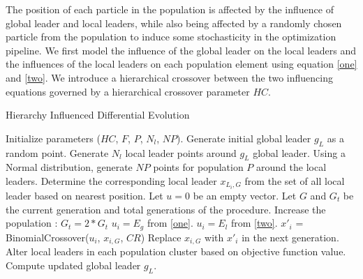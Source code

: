 \documentclass[a4paper,twoside]{article}
\begin{document}
The position of each particle in the population is affected by the influence of global leader and local leaders, while also being affected by a randomly chosen particle from the population to induce some stochasticity in the optimization pipeline. We first model the influence of the global leader on the local leaders and the influences of the local leaders  on each population element using equation \eqref{one} and \eqref{two}. We introduce a hierarchical crossover between the two influencing equations governed by a hierarchical crossover parameter $HC$.



\begin{algorithm}[b]
\caption{Hierarchy Influenced Differential Evolution}
\label{algo}
\begin{algorithmic}[1]
    \State Initialize parameters ($HC$, $F$, $P$, $N_l$, $NP$).
    \State Generate initial global leader $g_L$ as a random point.
    \State Generate $N_l$ local leader points around $g_L$ global leader.
    \State Using a Normal distribution, generate $NP$ points for population $P$ around the local leaders.
        \State Determine the corresponding local leader $x_{L_i,G}$ from the set of all local leader based on nearest position.
        \State Let $u = 0$ be an empty vector.
        \State Let $G$ and $G_{t}$ be the current generation and total generations of the procedure.
          \State Increase the population : $G_{t} = 2 * G_{t}$
        \EndIf
          \State $u_i = E_g$ from \eqref{one}.
        \Else
          \State $u_i = E_l$ from \eqref{two}.
        \EndIf
        \State $x'_{i}$ = BinomialCrossover($u_{i}$, $x_{i,G}$, $CR$)
          \State Replace $x_{i,G}$ with $x'_{i}$ in the next generation.
        \EndIf
      \EndFor
      \State Alter local leaders in each population cluster based on objective function value.
      \State Compute updated global leader $g_L$.
    \EndWhile
  \EndProcedure
\end{algorithmic}
\end{algorithm}
\end{document}
